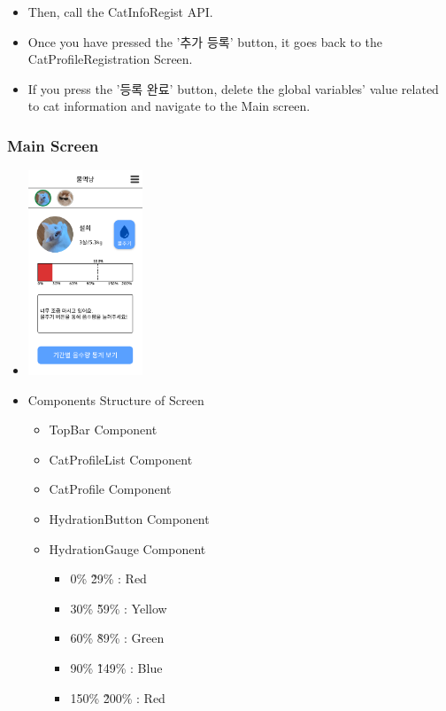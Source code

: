 \documentclass[conference]{IEEEtran}
\begin{document}
\begin{itemize}
\begin{itemize}
        \item Then, call the CatInfoRegist API.
        \item Once you have pressed the '추가 등록' button, it goes back to the CatProfileRegistration Screen.
        \item If you press the '등록 완료' button, delete the global variables' value related to cat information and navigate to the Main screen.
    \end{itemize}
\end{itemize}
\newpage

\subsubsection{Main Screen}
\begin{itemize}
    \item[] \includegraphics[width=0.27\textwidth]{img/D/15.png}
    \item Components Structure of Screen
    \begin{itemize}
        \item TopBar Component
        \item CatProfileList Component
        \item CatProfile Component
        \item HydrationButton Component
        \item HydrationGauge Component
        \begin{itemize}
            \item 0\% \~ 29\% : Red
            \item 30\% \~ 59\% : Yellow
            \item 60\% \~ 89\% : Green
            \item 90\% \~ 149\% : Blue
            \item 150\% \~ 200\% : Red
        \end{itemize}

\end{itemize}
\end{itemize}
\end{document}
